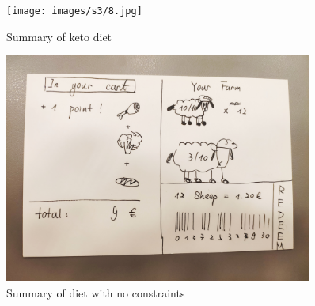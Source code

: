 \begin{figure}[H]
	\centering
	\texttt{[image: images/s3/8.jpg]}
	\caption{ Summary of keto diet }
	\label{s3:sumketo}
\end{figure}


\begin{figure}[H]
	\centering
	\includegraphics[trim={10em 10em 10em 10em}, clip, width=0.9\textwidth]{images/s3/11.jpg}
	\caption{ Summary of diet with no constraints }
	\label{s3:sumnocons}
\end{figure}